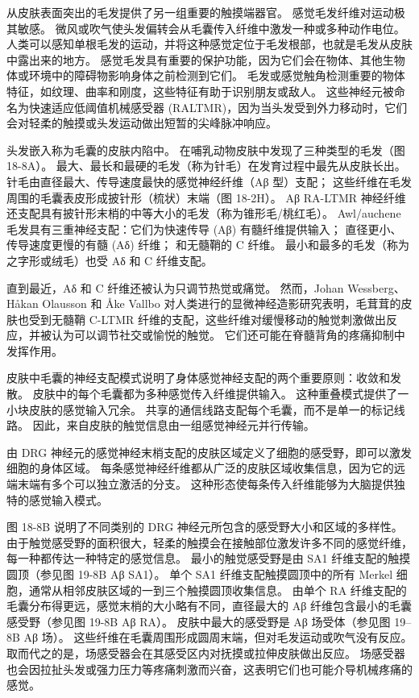 从皮肤表面突出的毛发提供了另一组重要的触摸端器官。 感觉毛发纤维对运动极其敏感。 微风或吹气使头发偏转会从毛囊传入纤维中激发一种或多种动作电位。 人类可以感知单根毛发的运动，并将这种感觉定位于毛发根部，也就是毛发从皮肤中露出来的地方。 感觉毛发具有重要的保护功能，因为它们会在物体、其他生物体或环境中的障碍物影响身体之前检测到它们。 毛发或感觉触角检测重要的物体特征，如纹理、曲率和刚度，这些特征有助于识别朋友或敌人。 这些神经元被命名为快速适应低阈值机械感受器 (RALTMR)，因为当头发受到外力移动时，它们会对轻柔的触摸或头发运动做出短暂的尖峰脉冲响应。

头发嵌入称为毛囊的皮肤内陷中。 在哺乳动物皮肤中发现了三种类型的毛发（图 18-8A）。 最大、最长和最硬的毛发（称为针毛）在发育过程中最先从皮肤长出。 针毛由直径最大、传导速度最快的感觉神经纤维（Aβ 型）支配； 这些纤维在毛发周围的毛囊表皮形成披针形（梳状）末端（图 18-2H）。 Aβ RA-LTMR 神经纤维还支配具有披针形末梢的中等大小的毛发（称为锥形毛/桃红毛）。 Awl/auchene 毛发具有三重神经支配：它们为快速传导 (Aβ) 有髓纤维提供输入； 直径更小、传导速度更慢的有髓 (Aδ) 纤维； 和无髓鞘的 C 纤维。 最小和最多的毛发（称为之字形或绒毛）也受 Aδ 和 C 纤维支配。

直到最近，Aδ 和 C 纤维还被认为只调节热觉或痛觉。 然而，Johan Wessberg、Håkan Olausson 和 Åke Vallbo 对人类进行的显微神经造影研究表明，毛茸茸的皮肤也受到无髓鞘 C-LTMR 纤维的支配，这些纤维对缓慢移动的触觉刺激做出反应，并被认为可以调节社交或愉悦的触觉。 它们还可能在脊髓背角的疼痛抑制中发挥作用。

皮肤中毛囊的神经支配模式说明了身体感觉神经支配的两个重要原则：收敛和发散。 皮肤中的每个毛囊都为多种感觉传入纤维提供输入。 这种重叠模式提供了一小块皮肤的感觉输入冗余。 共享的通信线路支配每个毛囊，而不是单一的标记线路。 因此，来自皮肤的触觉信息由一组感觉神经元并行传输。

由 DRG 神经元的感觉神经末梢支配的皮肤区域定义了细胞的感受野，即可以激发细胞的身体区域。 每条感觉神经纤维都从广泛的皮肤区域收集信息，因为它的远端末端有多个可以独立激活的分支。 这种形态使每条传入纤维能够为大脑提供独特的感觉输入模式。

图 18-8B 说明了不同类别的 DRG 神经元所包含的感受野大小和区域的多样性。 由于触觉感受野的面积很大，轻柔的触摸会在接触部位激发许多不同的感觉纤维，每一种都传达一种特定的感觉信息。 最小的触觉感受野是由 SA1 纤维支配的触摸圆顶（参见图 19-8B Aβ SA1）。 单个 SA1 纤维支配触摸圆顶中的所有 Merkel 细胞，通常从相邻皮肤区域的一到三个触摸圆顶收集信息。 由单个 RA 纤维支配的毛囊分布得更远，感觉末梢的大小略有不同，直径最大的 Aβ 纤维包含最小的毛囊感受野（参见图 19-8B Aβ RA）。 皮肤中最大的感受野是 Aβ 场受体（参见图 19–8B Aβ 场）。 这些纤维在毛囊周围形成圆周末端，但对毛发运动或吹气没有反应。 取而代之的是，场感受器会在其感受区内对抚摸或拉伸皮肤做出反应。 场感受器也会因拉扯头发或强力压力等疼痛刺激而兴奋，这表明它们也可能介导机械疼痛的感觉。

